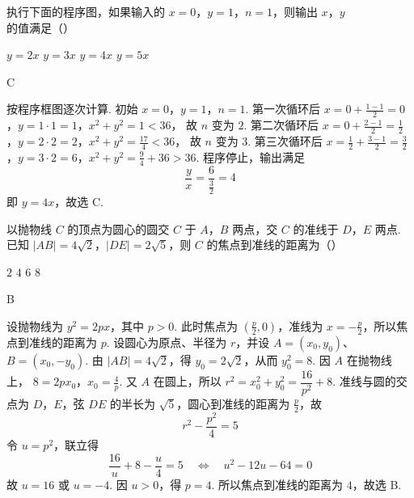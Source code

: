 \begin{problem}
执行下面的程序图，如果输入的 \(x=0\)，\(y=1\)，\(n=1\)，则输出 \(x\)，\(y\) 的值满足（\quad）


\choices
    {\(y=2x\)}
    {\(y=3x\)}
    {\(y=4x\)}
    {\(y=5x\)}
\end{problem}

\begin{answer}
C
\end{answer}

\begin{solution}
按程序框图逐次计算. 初始 \(x=0\)，\(y=1\)，\(n=1\). 第一次循环后
\(x=0+\frac{1-1}{2}=0\)，\(y=1\cdot1=1\)，\(x^2+y^2=1<36\)，
故 \(n\) 变为 \(2\). 第二次循环后
\(x=0+\frac{2-1}{2}=\frac12\)，\(y=2\cdot2=2\)，\(x^2+y^2=\frac{17}{4}<36\)，
故 \(n\) 变为 \(3\). 第三次循环后
\(x=\frac12+\frac{3-1}{2}=\frac32\)，\(y=3\cdot2=6\)，\(x^2+y^2=\frac94+36>36\).
程序停止，输出满足
\[
\frac{y}{x}=\frac{6}{\frac{3}{2}}=4
\]
即 \(y=4x\)，故选 C.
\end{solution}



\begin{problem}
以抛物线 \(C\) 的顶点为圆心的圆交 \(C\) 于 \(A\)，\(B\) 两点，交 \(C\) 的准线于 \(D\)，\(E\) 两点. 已知 \(|AB|=4\sqrt2\)，\(|DE|=2\sqrt5\)，则 \(C\) 的焦点到准线的距离为（\quad）

\choices
    {\(2\)}
    {\(4\)}
    {\(6\)}
    {\(8\)}
\end{problem}

\begin{answer}
B
\end{answer}

\begin{solution}
设抛物线为 \(y^2=2px\)，其中 \(p>0\). 此时焦点为 \((\frac{p}{2},0)\)，准线为 \(x=-\frac{p}{2}\)，所以焦点到准线的距离为 \(p\). 设圆心为原点、半径为 \(r\)，并设 \(A=(x_0,y_0)\)、\(B=(x_0,-y_0)\). 由 \(|AB|=4\sqrt2\)，得 \(y_0=2\sqrt2\)，从而 \(y_0^2=8\). 因 \(A\) 在抛物线上，
\(8=2px_0\)，\(x_0=\frac4p\).
又 \(A\) 在圆上，所以 \(r^2=x_0^2+y_0^2=\dfrac{16}{p^2}+8\). 准线与圆的交点为 \(D\)，\(E\)，弦 \(DE\) 的半长为 \(\sqrt5\)，圆心到准线的距离为 \(\frac{p}{2}\)，故
\[
r^2-\frac{p^2}{4}=5
\]
令 \(u=p^2\)，联立得
\[
\frac{16}{u}+8-\frac{u}{4}=5
\quad\Longleftrightarrow\quad
u^2-12u-64=0
\]
故 \(u=16\) 或 \(u=-4\). 因 \(u>0\)，得 \(p=4\). 所以焦点到准线的距离为 \(4\)，故选 B.
\end{solution}



